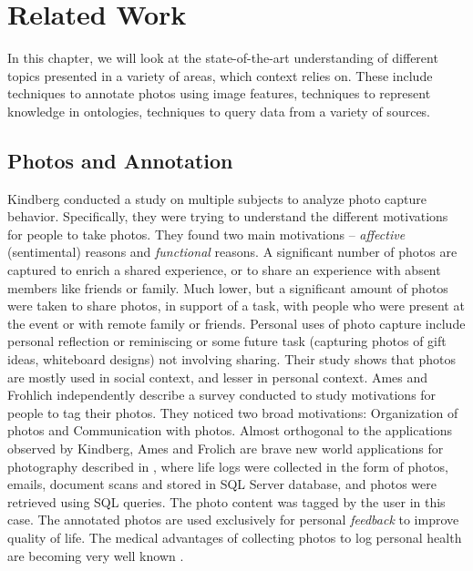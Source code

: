 \chapter{Related Work}

In this chapter, we will look at the state-of-the-art understanding of different topics presented in a variety of areas, which context relies on. These include techniques to annotate photos using image features, techniques to represent knowledge in ontologies, techniques to query data from a variety of sources.

\section{Photos and Annotation}

Kindberg \cite{kindberg2005ubiquitous} conducted a study on multiple subjects to analyze photo capture behavior. Specifically, they were trying to understand the different motivations for people to take photos. They found two main motivations -- \textit{affective} (sentimental) reasons and \textit{functional} reasons. A significant number of photos are captured to enrich a shared experience, or to share an experience with absent members like friends or family. Much lower, but a significant amount of photos were taken to share photos, in support of a task, with people who were present at the event or with remote family or friends. Personal uses of photo capture include personal reflection or reminiscing or some future task (capturing photos of gift ideas, whiteboard designs) not involving sharing. Their study shows that photos are mostly used in social context, and lesser in personal context. Ames \cite{ames2007we} and Frohlich \cite{frohlich2002requirements} independently describe a survey conducted to study motivations for people to tag their photos. They noticed two broad motivations: Organization of photos and Communication with photos. Almost orthogonal to the applications observed by Kindberg, Ames and Frolich are brave new world applications for photography described in \cite{gemmell2002mylifebits, dumais2003stuff}, where life logs were collected in the form of photos, emails, document scans and stored in SQL Server database, and photos were retrieved using SQL queries. The photo content was tagged by the user in this case. The annotated photos are used exclusively for personal \textit{feedback} to improve quality of life. The medical advantages of collecting photos to log personal health are becoming very well known \cite{bell2010total}.


